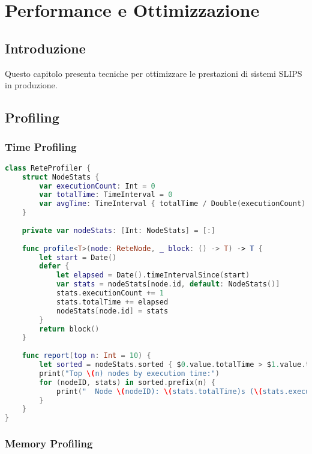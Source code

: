 
\chapter{Performance e Ottimizzazione}
\label{cap:performance}

\section{Introduzione}

Questo capitolo presenta tecniche per ottimizzare le prestazioni di sistemi SLIPS in produzione.

\section{Profiling}

\subsection{Time Profiling}

\begin{lstlisting}[language=Swift]
class ReteProfiler {
    struct NodeStats {
        var executionCount: Int = 0
        var totalTime: TimeInterval = 0
        var avgTime: TimeInterval { totalTime / Double(executionCount) }
    }
    
    private var nodeStats: [Int: NodeStats] = [:]
    
    func profile<T>(node: ReteNode, _ block: () -> T) -> T {
        let start = Date()
        defer {
            let elapsed = Date().timeIntervalSince(start)
            var stats = nodeStats[node.id, default: NodeStats()]
            stats.executionCount += 1
            stats.totalTime += elapsed
            nodeStats[node.id] = stats
        }
        return block()
    }
    
    func report(top n: Int = 10) {
        let sorted = nodeStats.sorted { $0.value.totalTime > $1.value.totalTime }
        print("Top \(n) nodes by execution time:")
        for (nodeID, stats) in sorted.prefix(n) {
            print("  Node \(nodeID): \(stats.totalTime)s (\(stats.executionCount) calls, avg: \(stats.avgTime)s)")
        }
    }
}
\end{lstlisting}

\subsection{Memory Profiling}

